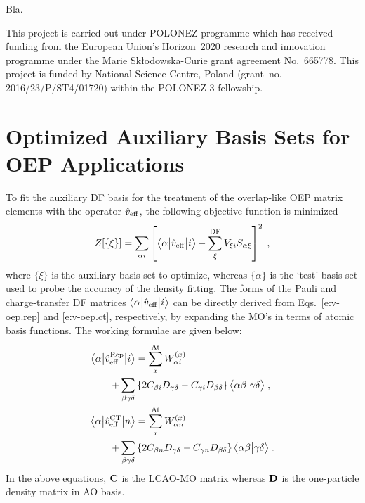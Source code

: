 Bla.

\begin{acknowledgments}
This project is carried out under POLONEZ programme which has received funding from the European Union's
Horizon~2020 research and innovation programme under the Marie Skłodowska-Curie grant agreement 
No.~665778. This project is funded by National Science Centre, Poland 
(grant~no. 2016/23/P/ST4/01720) within the POLONEZ 3 fellowship.
\end{acknowledgments}

\appendix

\section{Optimized Auxiliary Basis Sets for OEP Applications\label{a:auxiliary-basis}}

To fit the auxiliary DF basis for the treatment of the overlap\hyp{}like
OEP matrix elements with the operator $\hat{v}_{\rm eff}$, 
the following objective function is minimized
%
\begin{equation} \label{e:a1-obj}
 Z[\{\xi\}] = \sum_{\alpha i} \left[ 
     \bigl\langle {\alpha} \bigl\lvert {\hat{v}_{\rm eff}} \bigl\lvert {i} \bigr\rangle - 
     \sum_{\xi}^{\rm DF} V_{\xi i} S_{\alpha \xi} 
    \right]^2 \;,
\end{equation}
%
where $\{\xi\}$ is the auxiliary basis set to optimize, whereas $\{\alpha\}$
is the `test' basis set used to probe the accuracy of the density fitting.
The forms of the Pauli and charge\hyp{}transfer DF matrices $\bigl\langle {\alpha} \bigl\lvert {\hat{v}_{\rm eff}} \bigl\lvert {i} \bigr\rangle$
can be directly derived from Eqs.~\eqref{e:v-oep.rep} and \eqref{e:v-oep.ct}, respectively, 
by expanding the MO's in terms of atomic basis functions. The working formulae
are given below:
%
\begin{subequations} \label{e:a1-v.oep}
 \begin{align}
   \bigl\langle {\alpha} \bigl\lvert {\hat{v}_{\rm eff}^{\rm Rep}} \bigl\lvert {i} \bigr\rangle
     &= \sum_{x}^{\rm At} W_{\alpha i}^{(x)} \nonumber   \\ 
        + \sum_{\beta\gamma\delta} &
           \left\{ 
             2 C_{\beta i} D_{\gamma\delta} - C_{\gamma i} D_{\beta \delta}
           \right\}
           \bigl\langle {\alpha\beta} \bigl\lvert {\gamma\delta} \bigr\rangle \;,\\
   \bigl\langle {\alpha} \bigl\lvert {\hat{v}_{\rm eff}^{\rm CT}} \bigl\lvert {n} \bigr\rangle 
     &= \sum_{x}^{\rm At} W_{\alpha n}^{(x)} \nonumber   \\
       + \sum_{\beta\gamma\delta} &
           \left\{
             2 C_{\beta n} D_{\gamma\delta} - C_{\gamma n} D_{\beta \delta}
           \right\}
           \bigl\langle {\alpha\beta} \bigl\lvert {\gamma\delta} \bigr\rangle
    \;.
 \end{align}
\end{subequations}
%
In the above equations, ${\bf C}$ is the LCAO\hyp{}MO matrix whereas ${\bf D}$
is the one\hyp{}particle density matrix in AO basis.

